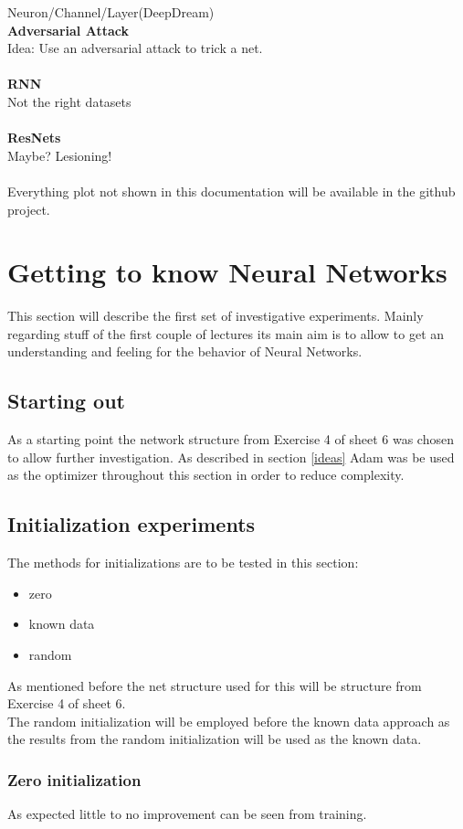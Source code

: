 \documentclass{article}
\begin{document}
\begin{multicols}{2}
Neuron/Channel/Layer(DeepDream)
\\
\textbf{Adversarial Attack}\\
Idea: Use an adversarial attack to trick a net.\\
\\
\textbf{RNN}\\
Not the right datasets\\
\\
\textbf{ResNets}\\
Maybe? Lesioning!
\\
\\
Everything plot not shown in this documentation will be available in the github project.

\section{Getting to know Neural Networks}
This section will describe the first set of investigative experiments. Mainly regarding stuff of the first couple of lectures its main aim is to allow to get an understanding and feeling for the behavior of Neural Networks.

\subsection{Starting out}
As a starting point the network structure from Exercise 4 of sheet 6 was chosen to allow further investigation. As described in section \ref{ideas} Adam was be used as the optimizer throughout this section in order to reduce complexity.

\subsection{Initialization experiments}
The methods for initializations are to be tested in this section:
\begin{itemize}
	\item zero
	\item known data
	\item random
\end{itemize}
As mentioned before the net structure used for this will be structure from Exercise 4 of sheet 6.\\
The random initialization will be employed before the known data approach as the results from the random initialization will be used as the known data.
\subsubsection{Zero initialization}
As expected little to no improvement can be seen from training.


\end{multicols}
\end{document}
